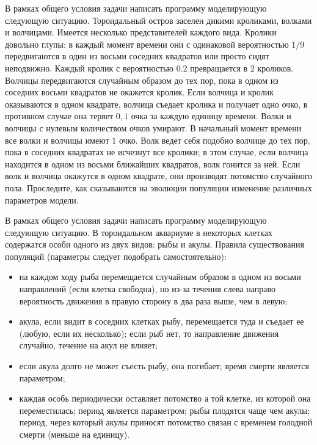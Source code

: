 \begin{zztask}
В рамках общего условия задачи написать программу моделирующую следующую 
ситуацию.
Тороидальный остров заселен дикими кроликами, волками и волчицами.
Имеется несколько представителей каждого вида. Кролики довольно глупы: 
в каждый момент времени они с одинаковой вероятностью $1/9$ передвигаются 
в один из восьми соседних квадратов или просто сидят неподвижно. Каждый кролик 
с вероятностью $0.2$ превращается в $2$ кроликов. Волчицы передвигаются 
случайным образом до тех пор, пока в одном из соседних восьми квадратов 
не окажется кролик. Если волчица и кролик оказываются в одном квадрате, 
волчица съедает кролика и получает одно очко, в противном случае она 
теряет $0,1$ очка за каждую единицу времени. Волки и волчицы с нулевым 
количеством очков умирают. В начальный момент времени все волки и волчицы 
имеют $1$ очко. Волк ведет себя подобно волчице до тех пор, пока в соседних 
квадратах не исчезнут все кролики; в этом случае, если волчица находится 
в одном из восьми ближайших квадратов, волк гонится за ней. Если волк и 
волчица окажутся в одном квадрате, они производят потомство случайного 
пола. Проследите, как сказываются на эволюции популяции изменение различных 
параметров модели. 
\end{zztask}

\begin{zztask}
В рамках общего условия задачи написать программу моделирующую следующую 
ситуацию.
В тороидальном аквариуме в некоторых клетках содержатся особи одного из 
двух видов: рыбы и акулы. Правила существования популяций (параметры следует
подобрать самостоятельно):
\begin{itemize}
	\item на каждом ходу рыба перемещается случайным образом в одном из восьми 
	направлений (если клетка свободна), но из-за течения слева направо вероятность 
	движения в правую сторону в два раза выше, чем в левую;
	\item акула, если видит в соседних клетках рыбу, перемещается туда и съедает 
	ее (любую, если их несколько); если рыб нет, то направление движения случайно, 
	течение на акул не влияет;
	\item если акула долго не может съесть рыбу, она погибает; время смерти является 
	параметром;
	\item каждая особь периодически оставляет потомство а той клетке, из которой она 
	переместилась; период является параметром; рыбы плодятся чаще чем акулы; период, 
	через который акулы приносят потомство связан с временем голодной смерти (меньше 
	на единицу).
\end{itemize}
\end{zztask}


